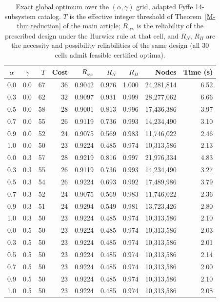 \begin{table}[!htbp]
\centering
\caption{Exact global optimum over the $(\alpha,\gamma)$ grid, adapted Fyffe 14-subsystem catalog. $T$ is the effective integer threshold of Theorem~\ref*{M-thm:reduction} of the main article; $R_{\mathrm{sys}}$ is the reliability of the prescribed design under the Hurwicz rule at that cell, and $R_N$, $R_\Pi$ are the necessity and possibility reliabilities of the same design (all 30 cells admit feasible certified optima).}
\label{tab:fyffe_stats}
\small
\begin{tabular}{ccrrrrrrr}
\hline
$\alpha$ & $\gamma$ & $T$ & Cost & $R_{\mathrm{sys}}$ & $R_N$ & $R_\Pi$ & Nodes & Time (s)\\
\hline
0.0 & 0.0 & 67 & 36 & 0.9042 & 0.976 & 1.000 & 24,281,814 & 6.52 \\
0.3 & 0.0 & 62 & 32 & 0.9097 & 0.931 & 0.999 & 28,277,062 & 6.66 \\
0.5 & 0.0 & 58 & 28 & 0.9001 & 0.813 & 0.996 & 17,436,386 & 3.97 \\
0.7 & 0.0 & 55 & 26 & 0.9119 & 0.736 & 0.993 & 14,234,490 & 3.10 \\
0.9 & 0.0 & 52 & 24 & 0.9075 & 0.569 & 0.983 & 11,746,022 & 2.46 \\
1.0 & 0.0 & 50 & 23 & 0.9224 & 0.485 & 0.974 & 10,313,586 & 2.13 \\
\hline
0.0 & 0.3 & 57 & 28 & 0.9219 & 0.816 & 0.997 & 21,976,334 & 4.83 \\
0.3 & 0.3 & 55 & 26 & 0.9119 & 0.736 & 0.993 & 14,234,490 & 3.27 \\
0.5 & 0.3 & 54 & 26 & 0.9224 & 0.693 & 0.992 & 17,489,986 & 3.79 \\
0.7 & 0.3 & 52 & 24 & 0.9075 & 0.569 & 0.983 & 11,746,022 & 2.36 \\
0.9 & 0.3 & 51 & 24 & 0.9294 & 0.549 & 0.981 & 13,723,426 & 2.80 \\
1.0 & 0.3 & 50 & 23 & 0.9224 & 0.485 & 0.974 & 10,313,586 & 2.10 \\
\hline
0.0 & 0.5 & 50 & 23 & 0.9224 & 0.485 & 0.974 & 10,313,586 & 2.03 \\
0.3 & 0.5 & 50 & 23 & 0.9224 & 0.485 & 0.974 & 10,313,586 & 2.01 \\
0.5 & 0.5 & 50 & 23 & 0.9224 & 0.485 & 0.974 & 10,313,586 & 2.14 \\
0.7 & 0.5 & 50 & 23 & 0.9224 & 0.485 & 0.974 & 10,313,586 & 2.00 \\
0.9 & 0.5 & 50 & 23 & 0.9224 & 0.485 & 0.974 & 10,313,586 & 2.10 \\
1.0 & 0.5 & 50 & 23 & 0.9224 & 0.485 & 0.974 & 10,313,586 & 2.08 \\

\end{tabular}
\end{table}
